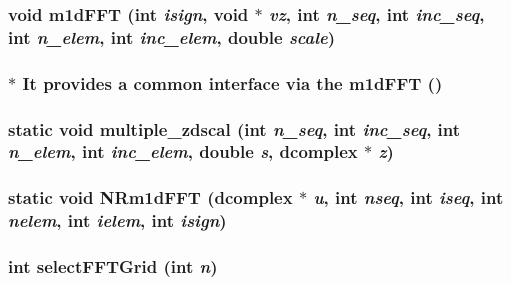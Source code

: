 \subsubsection{\setlength{\rightskip}{0pt plus 5cm}void m1d\-FFT (int {\em isign}, void $\ast$ {\em vz}, int {\em n\_\-seq}, int {\em inc\_\-seq}, int {\em n\_\-elem}, int {\em inc\_\-elem}, double {\em scale})}\label{fftwrap_8c_86ed7d309a06f95717a0afd0fa5a0d94}


\subsubsection{\setlength{\rightskip}{0pt plus 5cm}$\ast$ It provides a common interface via the m1d\-FFT ()}\label{fftwrap_8c_a73a15d628e4cd563f0910acba9babb1}


\subsubsection{\setlength{\rightskip}{0pt plus 5cm}static void multiple\_\-zdscal (int {\em n\_\-seq}, int {\em inc\_\-seq}, int {\em n\_\-elem}, int {\em inc\_\-elem}, double {\em s}, {\bf dcomplex} $\ast$ {\em z})\hspace{0.3cm}{\tt  [static]}}\label{fftwrap_8c_df5074eb43f4db739f47f2c6438f7e85}


\subsubsection{\setlength{\rightskip}{0pt plus 5cm}static void NRm1d\-FFT ({\bf dcomplex} $\ast$ {\em u}, int {\em nseq}, int {\em iseq}, int {\em nelem}, int {\em ielem}, int {\em isign})\hspace{0.3cm}{\tt  [static]}}\label{fftwrap_8c_e305e673328e6df8745eca0ae0d65d38}


\subsubsection{\setlength{\rightskip}{0pt plus 5cm}int select\-FFTGrid (int {\em n})}\label{fftwrap_8c_6cf3832e181ea8cd27f85932fdcb9682}


